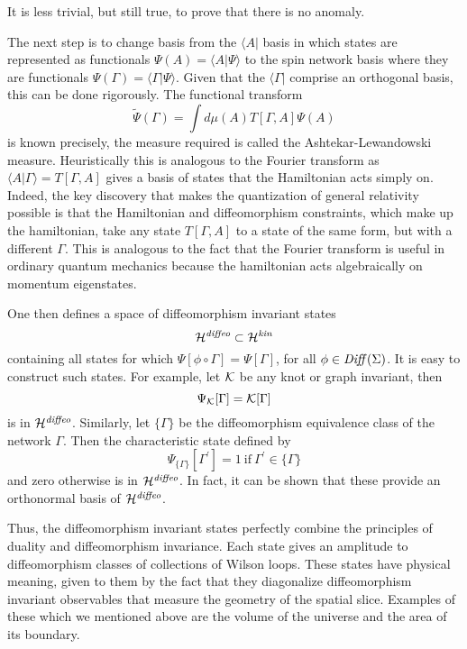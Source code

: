 \documentclass[12pt]{article}
\newcommand{\f}{\begin{equation}}
\newcommand{\ff}{\end{equation}}
\def\Diff{\mathop{\it Diff}}
\begin{document}
It is less trivial, but still true, to prove that there is no anomaly.  

The next step is to change basis from the $\langle A| $ basis
in which states are represented as functionals $\Psi (A)= \langle A|\Psi \rangle$ 
 to the spin network
basis where they are functionals $\Psi (\Gamma ) = \langle\Gamma |\Psi \rangle$.
Given that the $\langle\Gamma |$ comprise an orthogonal basis, this
can be done rigorously.  The functional transform 
\f
\tilde{\Psi} (\Gamma ) = \int d\mu (A) T[\Gamma , A] \Psi (A)
\ff
is known precisely, the measure required is called the
Ashtekar-Lewandowski measure.  Heuristically this is analogous to the Fourier
transform as $\langle A|\Gamma \rangle = T[\Gamma , A]$ gives a basis of states that
the Hamiltonian acts simply on.  Indeed, the key discovery that makes the
quantization of general relativity 
 possible is that the Hamiltonian and diffeomorphism constraints,
which make up the hamiltonian, take any state $ T[\Gamma , A]$ to a state
of the same form, but with a different $\Gamma$.  This is analogous to the fact
that the Fourier transform is useful in ordinary quantum mechanics because the
hamiltonian acts algebraically on momentum eigenstates. 

One then defines a space of diffeomorphism invariant states
\f
{\cal H}^{\it diffeo} \subset {\cal H}^{\it kin}
\ff 
containing all states for which $\Psi [\phi \circ \Gamma ] = \Psi [\Gamma ]$,
for all $\phi \in \Diff( \Sigma )$.  It is easy to  construct such states. For example,
let ${\cal K}$ be any knot or graph invariant, then 
\f
\Psi_{\cal K}[\Gamma ]={\cal K}[\Gamma ]
\ff
is in ${\cal H}^{\it diffeo}$.    Similarly, let $\{ \Gamma \} $ be the diffeomorphism 
equivalence class of
the network $\Gamma $. Then the characteristic state defined by 
\f
\Psi_{\{ \Gamma \} } [\Gamma^\prime  ] = 1 \  \mbox{if}  \  \Gamma^\prime \in \{ \Gamma \} 
\ff
and zero otherwise is in ${\cal H}^{\it diffeo}$. In fact, it can be shown that these
provide an orthonormal basis of ${\cal H}^{\it diffeo}$.  

Thus, the diffeomorphism invariant states perfectly combine the principles of
duality and diffeomorphism invariance.  Each state gives an amplitude to
diffeomorphism classes of collections of Wilson loops.  These states have
physical meaning, given to them by the fact that they diagonalize diffeomorphism
invariant observables that measure the geometry of the 
spatial slice. Examples of these which we mentioned 
above are the volume of the universe and the area of its boundary.  
\end{document}
